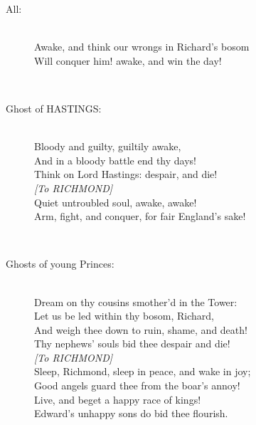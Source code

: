 \documentclass{article}
\begin{document}
\begin{description}
\item[All:] 
\hspace{1pt}\\
\hspace{1pt}Awake, and think our wrongs in Richard's bosom\\
\hspace{1pt}Will conquer him! awake, and win the day!\\
\end{description}
\\
\begin{description}
\item[Ghost of HASTINGS:] 
\hspace{1pt}\\
\hspace{1pt}Bloody and guilty, guiltily awake,\\
\hspace{1pt}And in a bloody battle end thy days!\\
\hspace{1pt}Think on Lord Hastings: despair, and die!\\
{\it [To RICHMOND]}\\
\hspace{1pt}Quiet untroubled soul, awake, awake!\\
\hspace{1pt}Arm, fight, and conquer, for fair England's sake!\\
\end{description}
\\
\begin{description}
\item[Ghosts of young Princes:] 
\hspace{1pt}\\
\hspace{1pt}Dream on thy cousins smother'd in the Tower:\\
\hspace{1pt}Let us be led within thy bosom, Richard,\\
\hspace{1pt}And weigh thee down to ruin, shame, and death!\\
\hspace{1pt}Thy nephews' souls bid thee despair and die!\\
{\it [To RICHMOND]}\\
\hspace{1pt}Sleep, Richmond, sleep in peace, and wake in joy;\\
\hspace{1pt}Good angels guard thee from the boar's annoy!\\
\hspace{1pt}Live, and beget a happy race of kings!\\
\hspace{1pt}Edward's unhappy sons do bid thee flourish.\\
\end{description}
\end{document}
